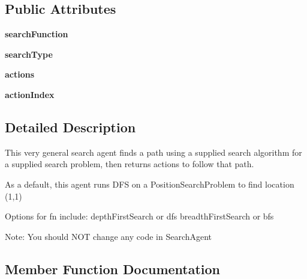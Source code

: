 \subsection*{Public Attributes}
\begin{DoxyCompactItemize}
\item 
\mbox{\label{classsearch_agents_1_1_search_agent_a0069fcdd1ef320fba53b061a089b8c75}} 
{\bfseries search\+Function}
\item 
\mbox{\label{classsearch_agents_1_1_search_agent_aefb34eff1833b65182b9b02fe1f3e91c}} 
{\bfseries search\+Type}
\item 
\mbox{\label{classsearch_agents_1_1_search_agent_a9c62e2023013bf42e0fa859ba7eab71d}} 
{\bfseries actions}
\item 
\mbox{\label{classsearch_agents_1_1_search_agent_aa38beac5831e0bdab8445d0d792c684c}} 
{\bfseries action\+Index}
\end{DoxyCompactItemize}


\subsection{Detailed Description}
\begin{DoxyVerb}This very general search agent finds a path using a supplied search algorithm for a
supplied search problem, then returns actions to follow that path.

As a default, this agent runs DFS on a PositionSearchProblem to find location (1,1)

Options for fn include:
  depthFirstSearch or dfs
  breadthFirstSearch or bfs


Note: You should NOT change any code in SearchAgent
\end{DoxyVerb}
 

\subsection{Member Function Documentation}
\mbox{\label{classsearch_agents_1_1_search_agent_a93ab497b5d38054a8aa628c2a2339d13}} 
